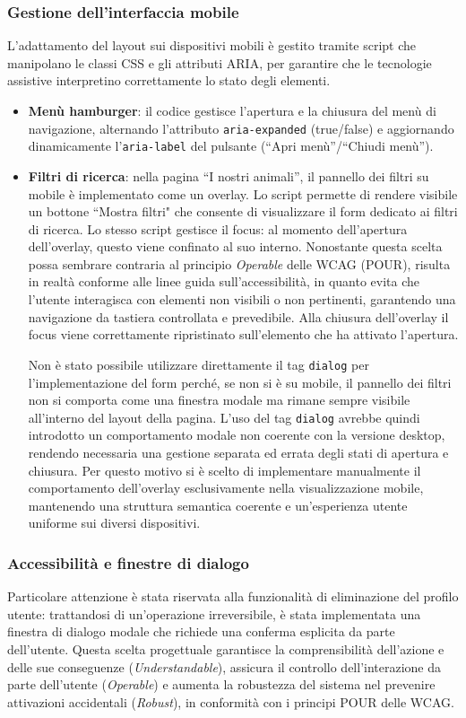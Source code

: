 \documentclass[10pt, letterpaper]{article}
\begin{document}
\subsubsection{Gestione dell'interfaccia mobile}
L'adattamento del layout sui dispositivi mobili è gestito tramite script che manipolano le classi CSS e gli attributi ARIA, per garantire che le tecnologie assistive interpretino correttamente lo stato degli elementi.
\begin{itemize}
    \item \textbf{Menù hamburger}: il codice gestisce l'apertura e la chiusura del menù di navigazione, alternando l'attributo \texttt{aria-expanded} (true/false) e aggiornando dinamicamente l'\texttt{aria-label} del pulsante (“Apri menù''/“Chiudi menù'').
    \item \textbf{Filtri di ricerca}: nella pagina “I nostri animali'', il pannello dei filtri su mobile è implementato come un overlay. Lo script permette di rendere visibile un bottone “Mostra filtri" che consente di visualizzare il form dedicato ai filtri di ricerca. Lo stesso script gestisce il focus: al momento dell’apertura dell’overlay, questo viene confinato al suo interno. Nonostante questa scelta possa sembrare contraria al principio \emph{Operable} delle WCAG (POUR), risulta in realtà conforme alle linee guida sull’accessibilità, in quanto evita che l’utente interagisca con elementi non visibili o non pertinenti, garantendo una navigazione da tastiera controllata e prevedibile. 
    Alla chiusura dell'overlay il focus viene correttamente ripristinato sull'elemento che ha attivato l'apertura. 
    
    Non è stato possibile utilizzare direttamente il tag \texttt{dialog} per l'implementazione del form perché, se non si è su mobile, il pannello dei filtri non si comporta come una finestra modale ma rimane sempre visibile all’interno del layout della pagina. 
    L'uso del tag \texttt{dialog} avrebbe quindi introdotto un comportamento modale non coerente con la versione desktop, rendendo necessaria una gestione separata ed errata degli stati di apertura e chiusura. Per questo motivo si è scelto di implementare manualmente il comportamento dell’overlay esclusivamente nella visualizzazione mobile, mantenendo una struttura semantica coerente e un’esperienza utente uniforme sui diversi dispositivi.
\end{itemize}

\subsubsection{Accessibilità e finestre di dialogo}
Particolare attenzione è stata riservata alla funzionalità di eliminazione del profilo utente: trattandosi di un’operazione irreversibile, è stata implementata una finestra di dialogo modale che richiede una conferma esplicita da parte dell’utente. Questa scelta progettuale garantisce la comprensibilità dell’azione e delle sue conseguenze (\emph{Understandable}), assicura il controllo dell’interazione da parte dell’utente (\emph{Operable}) e aumenta la robustezza del sistema nel prevenire attivazioni accidentali (\emph{Robust}), in conformità con i principi POUR delle WCAG.
\end{document}
